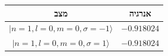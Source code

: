 \begin{tabular}{c c}
מצב & אנרגיה \\
\hline
$|n=1, l=0, m=0, \sigma=-1\rangle$ & $-0.918024$ \\
$|n=1, l=0, m=0, \sigma=1\rangle$ & $-0.918024$ \\
\end{tabular}
